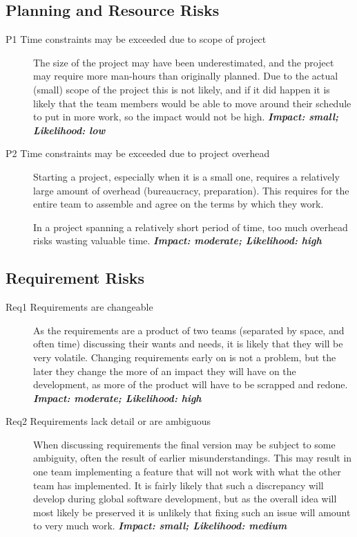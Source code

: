 \subsection{Planning and Resource Risks}
\begin{description}
    \item[P1 Time constraints may be exceeded due to scope of project] The size of the project may have
        been underestimated, and the project may require more man-hours than originally planned. Due to the
        actual (small) scope of the project this is not likely, and if it did happen it is likely that the
        team members would be able to move around their schedule to put in more work, so the impact would
        not be high.\newline
        \textbf{\emph{Impact: small; Likelihood: low}}
    \item[P2 Time constraints may be exceeded due to project overhead] Starting a project, especially when
        it is a small one, requires a relatively large amount of overhead (bureaucracy, preparation). This
        requires for the entire team to assemble and agree on the terms by which they work.
        
        In a project spanning a relatively short period of time, too much overhead risks wasting valuable
        time.\newline
        \textbf{\emph{Impact: moderate; Likelihood: high}}
\end{description}

\subsection{Requirement Risks}
\begin{description}
    \item[Req1 Requirements are changeable] As the requirements are a product of two teams (separated by
        space, and often time) discussing their wants and needs, it is likely that they will be very
        volatile. Changing requirements early on is not a problem, but the later they change the more of an
        impact they will have on the development, as more of the product will have to be scrapped and redone.
        \newline
        \textbf{\emph{Impact: moderate; Likelihood: high}}
    \item[Req2 Requirements lack detail or are ambiguous] When discussing requirements the final version may
        be subject to some ambiguity, often the result of earlier misunderstandings. This may result in one
        team implementing a feature that will not work with what the other team has implemented. It is fairly
        likely that such a discrepancy will develop during global software development, but as the overall
        idea will most likely be preserved it is unlikely that fixing such an issue will amount to very much work.
        \newline
        \textbf{\emph{Impact: small; Likelihood: medium}}
\end{description}
